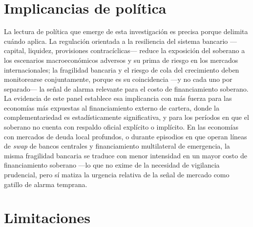 \section{Implicancias de política}

La lectura de política que emerge de esta investigación es precisa porque delimita cuándo aplica. La regulación orientada a la resiliencia del sistema bancario —capital, liquidez, provisiones contracíclicas— reduce la exposición del soberano a los escenarios macroeconómicos adversos y su prima de riesgo en los mercados internacionales; la fragilidad bancaria y el riesgo de cola del crecimiento deben monitorearse conjuntamente, porque es su coincidencia —y no cada uno por separado— la señal de alarma relevante para el costo de financiamiento soberano. La evidencia de este panel establece esa implicancia con más fuerza para las economías más expuestas al financiamiento externo de cartera, donde la complementariedad es estadísticamente significativa, y para los períodos en que el soberano no cuenta con respaldo oficial explícito o implícito. En las economías con mercados de deuda local profundos, o durante episodios en que operan líneas de \textit{swap} de bancos centrales y financiamiento multilateral de emergencia, la misma fragilidad bancaria se traduce con menor intensidad en un mayor costo de financiamiento soberano —lo que no exime de la necesidad de vigilancia prudencial, pero sí matiza la urgencia relativa de la señal de mercado como gatillo de alarma temprana.

\section{Limitaciones}

